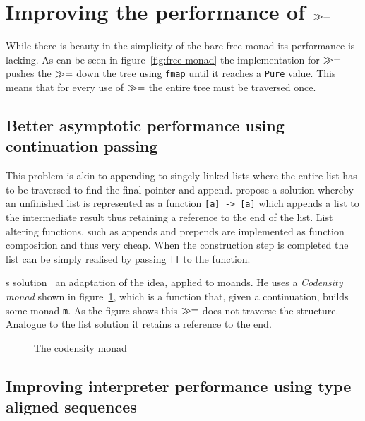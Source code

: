 \section{Improving the performance of $\gg=$}

\label{sec:bind-performance}

While there is beauty in the simplicity of the bare free monad its performance
is lacking. As can be seen in figure~\ref{fig:free-monad} the implementation for
$\gg=$ pushes the $\gg=$ down the tree using \texttt{fmap} until it
reaches a \texttt{Pure} value. This means that for every use of $\gg=$ the
entire tree must be traversed once.

\subsection{Better asymptotic performance using continuation passing}

\label{sec:performance-with-codensity}

This problem is akin to appending to singely linked lists where the entire list
has to be traversed to find the final pointer and append. \cite{difference-list}
propose a solution whereby an unfinished list is represented as a function
\texttt{[a] -> [a]} which appends a list to the intermediate result thus
retaining a reference to the end of the list. List
altering functions, such as appends and prepends are implemented as function
composition and thus very cheap. When the construction step is completed the
list can be simply realised by passing \texttt{[]} to the function.

\cite{asymptotic-performance-improvement}s
solution~\cite{asymptotic-performance-improvement} an adaptation of the idea,
applied to moands. He uses a \emph{Codensity monad} shown in
figure~\ref{fig:codensity-monad}, which is a function that, given a
continuation, builds some monad \texttt{m}. As the figure shows this $\gg=$
does not traverse the structure. Analogue to the list solution it retains a
reference to the end.

\begin{figure}
  
  \caption{The codensity monad}
  \label{fig:codensity-monad}
\end{figure}

\subsection{Improving interpreter performance using type aligned sequences}

